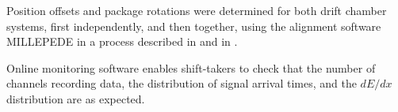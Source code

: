 Position offsets and package rotations were determined for both drift chamber systems, first independently, and then together, using the alignment software MILLEPEDE\cite{millepede} in a process described in \cite{GlueXCDCNIM} and in \cite{MikeStaib_thesis}.

Online monitoring software enables shift-takers to check that the number of channels recording data, the distribution of signal arrival times, and the  $dE/dx$ distribution are as expected. 


 
 
